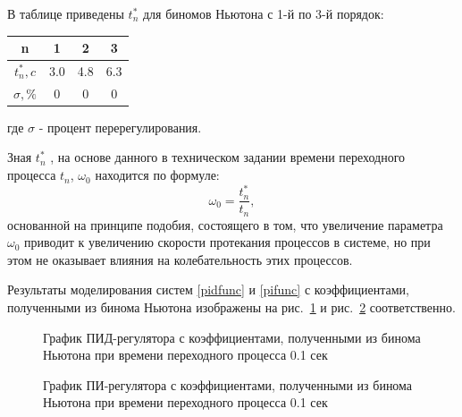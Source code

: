 В таблице приведены $t_n^*$ для биномов Ньютона с 1-й по 3-й порядок:
\begin{center}
\begin{tabular}{ |c|c|c|c| } 
 \hline
 n &  1 & 2 & 3  \\ 
 \hline
 $t_n^*, c$ &  3.0 & 4.8 & 6.3  \\ 
 \hline
 $\sigma, \%$ &  0 & 0 & 0  \\ 
 \hline
\end{tabular}
\end{center}
где $\sigma$ - процент перерегулирования. 

Зная $t_n^*$ , на основе данного в техническом задании времени переходного процесса $t_n$, $\omega_0$ находится по формуле: 
\begin{equation}\label{omeganul}
	\omega_0=\frac{t_n^*}{t_n},
\end{equation}
основанной на принципе подобия, состоящего в том, что увеличение параметра $\omega_0$ приводит к увеличению скорости протекания процессов в системе, но при этом не оказывает влияния на колебательность этих процессов.

Результаты моделирования систем \eqref{pidfunc} и \eqref{pifunc} с коэффициентами, полученными из бинома Ньютона изображены на рис.~\ref{pidmod} и рис.~\ref{pimod} соответственно.

\begin{figure}[h]
	\noindent{}
	\caption{График ПИД-регулятора с коэффициентами, полученными из бинома Ньютона при времени переходного процесса 0.1 сек }
	\label{pidmod}
\end{figure}

\begin{figure}[h]
	\noindent{}
	\caption{График ПИ-регулятора с коэффициентами, полученными из бинома Ньютона при времени переходного процесса 0.1 сек }
	\label{pimod}
\end{figure}

